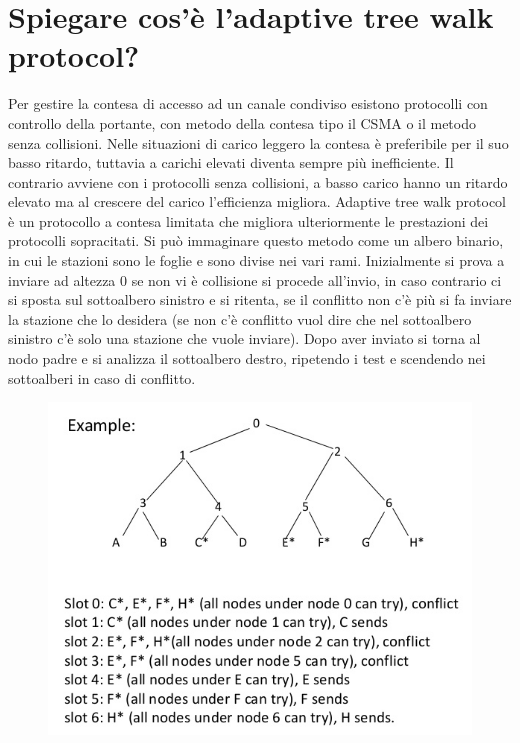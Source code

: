 \section{Spiegare cos’è l’adaptive tree walk protocol?}

Per gestire la contesa di accesso ad un canale condiviso esistono protocolli con controllo della portante, con metodo della contesa tipo il CSMA o il metodo senza collisioni. Nelle situazioni di carico leggero la contesa è preferibile per il suo basso ritardo, tuttavia a carichi elevati diventa sempre più inefficiente. Il contrario avviene con i protocolli senza collisioni, a basso carico hanno un ritardo elevato ma al crescere del carico l’efficienza migliora.
Adaptive tree walk protocol è un protocollo a contesa limitata che migliora ulteriormente le prestazioni dei protocolli sopracitati.
Si può immaginare questo metodo come un albero binario, in cui le stazioni sono le foglie e sono divise nei vari rami. Inizialmente si prova a inviare ad altezza 0 se non vi è collisione si procede all’invio, in caso contrario ci si sposta sul sottoalbero sinistro e si ritenta, se il conflitto non c’è più si fa inviare la stazione che lo desidera (se non c’è conflitto vuol dire che nel sottoalbero sinistro c’è solo una stazione che vuole inviare). Dopo aver inviato si torna al nodo padre e si analizza il sottoalbero destro, ripetendo i test e scendendo nei sottoalberi in caso di conflitto.

\begin{figure}[H]
\centering
\includegraphics[scale=0.7]{res/img/26_AdaptiveTreeProtocol.png}
\end{figure}
 
